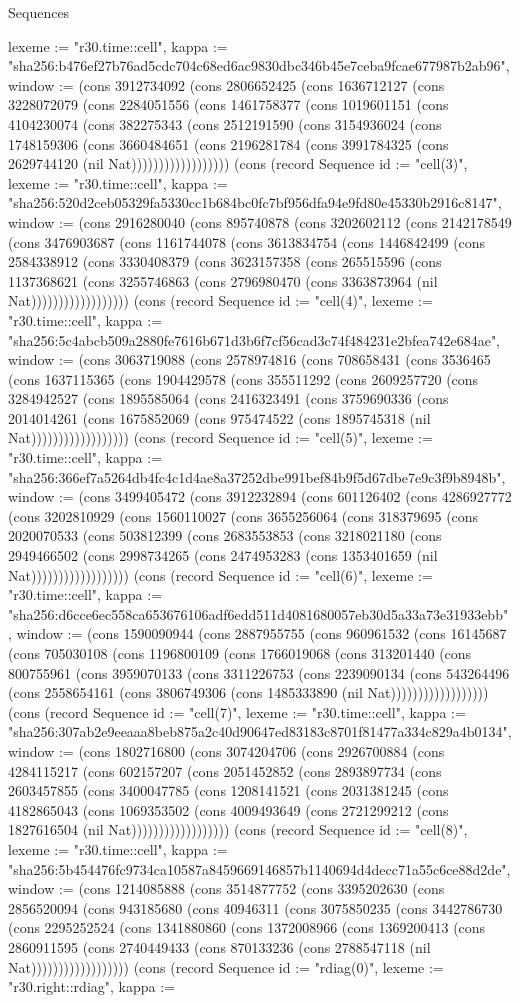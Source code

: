 \begin{lexlean}{Sequences}
\begin{semanticmodule}
{lexeme := "r30.time::cell", kappa := "sha256:b476ef27b76ad5cdc704c68ed6ac9830dbc346b45e7ceba9fcae677987b2ab96", window := (cons 3912734092 (cons 2806652425 (cons 1636712127 (cons 3228072079 (cons 2284051556 (cons 1461758377 (cons 1019601151 (cons 4104230074 (cons 382275343 (cons 2512191590 (cons 3154936024 (cons 1748159306 (cons 3660484651 (cons 2196281784 (cons 3991784325 (cons 2629744120 (nil Nat)))))))))))))))))}) (cons (record Sequence {id := "cell(3)", lexeme := "r30.time::cell", kappa := "sha256:520d2ceb05329fa5330cc1b684bc0fc7bf956dfa94e9fd80e45330b2916c8147", window := (cons 2916280040 (cons 895740878 (cons 3202602112 (cons 2142178549 (cons 3476903687 (cons 1161744078 (cons 3613834754 (cons 1446842499 (cons 2584338912 (cons 3330408379 (cons 3623157358 (cons 265515596 (cons 1137368621 (cons 3255746863 (cons 2796980470 (cons 3363873964 (nil Nat)))))))))))))))))}) (cons (record Sequence {id := "cell(4)", lexeme := "r30.time::cell", kappa := "sha256:5c4abcb509a2880fe7616b671d3b6f7cf56cad3c74f484231e2bfea742e684ae", window := (cons 3063719088 (cons 2578974816 (cons 708658431 (cons 3536465 (cons 1637115365 (cons 1904429578 (cons 355511292 (cons 2609257720 (cons 3284942527 (cons 1895585064 (cons 2416323491 (cons 3759690336 (cons 2014014261 (cons 1675852069 (cons 975474522 (cons 1895745318 (nil Nat)))))))))))))))))}) (cons (record Sequence {id := "cell(5)", lexeme := "r30.time::cell", kappa := "sha256:366ef7a5264db4fc4c1d4ae8a37252dbe991bef84b9f5d67dbe7e9c3f9b8948b", window := (cons 3499405472 (cons 3912232894 (cons 601126402 (cons 4286927772 (cons 3202810929 (cons 1560110027 (cons 3655256064 (cons 318379695 (cons 2020070533 (cons 503812399 (cons 2683553853 (cons 3218021180 (cons 2949466502 (cons 2998734265 (cons 2474953283 (cons 1353401659 (nil Nat)))))))))))))))))}) (cons (record Sequence {id := "cell(6)", lexeme := "r30.time::cell", kappa := "sha256:d6cce6ec558ca653676106adf6edd511d4081680057eb30d5a33a73e31933ebb", window := (cons 1590090944 (cons 2887955755 (cons 960961532 (cons 16145687 (cons 705030108 (cons 1196800109 (cons 1766019068 (cons 313201440 (cons 800755961 (cons 3959070133 (cons 3311226753 (cons 2239090134 (cons 543264496 (cons 2558654161 (cons 3806749306 (cons 1485333890 (nil Nat)))))))))))))))))}) (cons (record Sequence {id := "cell(7)", lexeme := "r30.time::cell", kappa := "sha256:307ab2e9eeaaa8beb875a2c40d90647ed83183c8701f81477a334c829a4b0134", window := (cons 1802716800 (cons 3074204706 (cons 2926700884 (cons 4284115217 (cons 602157207 (cons 2051452852 (cons 2893897734 (cons 2603457855 (cons 3400047785 (cons 1208141521 (cons 2031381245 (cons 4182865043 (cons 1069353502 (cons 4009493649 (cons 2721299212 (cons 1827616504 (nil Nat)))))))))))))))))}) (cons (record Sequence {id := "cell(8)", lexeme := "r30.time::cell", kappa := "sha256:5b454476fc9734ca10587a8459669146857b1140694d4decc71a55c6ce88d2de", window := (cons 1214085888 (cons 3514877752 (cons 3395202630 (cons 2856520094 (cons 943185680 (cons 40946311 (cons 3075850235 (cons 3442786730 (cons 2295252524 (cons 1341880860 (cons 1372008966 (cons 1369200413 (cons 2860911595 (cons 2740449433 (cons 870133236 (cons 2788547118 (nil Nat)))))))))))))))))}) (cons (record Sequence {id := "rdiag(0)", lexeme := "r30.right::rdiag", kappa := }
\end{semanticmodule}
\end{lexlean}
